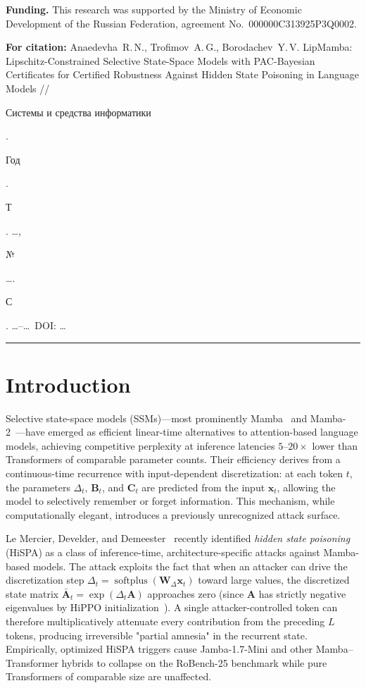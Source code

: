 \documentclass[12pt,a4paper]{article}
\theoremstyle{definition}
\theoremstyle{remark}
\newcommand{\ru}[1]{\begin{otherlanguage}{russian}#1\end{otherlanguage}}
\newcommand{\modelname}{LipMamba}
\DeclareMathOperator{\softplus}{softplus}
\begin{document}
\vspace{0.4em}

\noindent\textbf{Funding.} This research was supported by the Ministry of Economic Development of the Russian Federation, agreement No.~000000C313925P3Q0002.

\vspace{0.4em}

\noindent\textbf{For citation:} Anaedevha~R.\,N., Trofimov~A.\,G., Borodachev~Y.\,V. \modelname{}: Lipschitz-Constrained Selective State-Space Models with PAC-Bayesian Certificates for Certified Robustness Against Hidden State Poisoning in Language Models // \ru{Системы и средства информатики}. \ru{Год}. \ru{Т}. \ldots, \ru{№} \ldots. \ru{С}. \ldots--\ldots\ DOI: \ldots

\vspace{1.0em}
\hrule
\vspace{0.6em}

\section{Introduction}
\label{sec:introduction}


Selective state-space models (SSMs)---most prominently Mamba~\cite{gu2024mamba} and Mamba-2~\cite{dao2024mamba2}---have emerged as efficient linear-time alternatives to attention-based language models, achieving competitive perplexity at inference latencies $5$--$20\times$ lower than Transformers of comparable parameter counts. Their efficiency derives from a continuous-time recurrence with input-dependent discretization: at each token $t$, the parameters $\Delta_t$, $\mathbf{B}_t$, and $\mathbf{C}_t$ are predicted from the input $\mathbf{x}_t$, allowing the model to selectively remember or forget information. This mechanism, while computationally elegant, introduces a previously unrecognized attack surface.

Le Mercier, Develder, and Demeester~\cite{lemercier2026hispa} recently identified \emph{hidden state poisoning} (HiSPA) as a class of inference-time, architecture-specific attacks against Mamba-based models. The attack exploits the fact that when an attacker can drive the discretization step $\Delta_t = \softplus(\mathbf{W}_\Delta \mathbf{x}_t)$ toward large values, the discretized state matrix $\bar{\mathbf{A}}_t = \exp(\Delta_t \mathbf{A})$ approaches zero (since $\mathbf{A}$ has strictly negative eigenvalues by HiPPO initialization~\cite{gu2020hippo}). A single attacker-controlled token can therefore multiplicatively attenuate every contribution from the preceding $L$ tokens, producing irreversible "partial amnesia" in the recurrent state. Empirically, optimized HiSPA triggers cause Jamba-1.7-Mini and other Mamba--Transformer hybrids to collapse on the RoBench-25 benchmark while pure Transformers of comparable size are unaffected.
\end{document}
